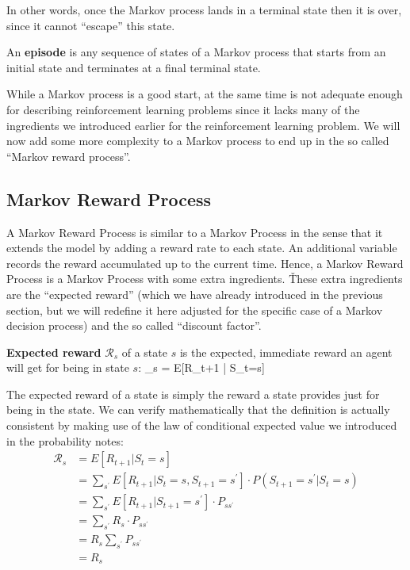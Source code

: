 In other words, once the Markov process lands in a terminal state then it is over, since it cannot ``escape'' this 
state.

\bd[Episode]
An \textbf{episode} is any sequence of states of a Markov process that starts from an initial state and terminates at
a final terminal state. 
\ed

While a Markov process is a good start, at the same time is not adequate enough for describing reinforcement 
learning problems since it lacks many of the ingredients we introduced earlier for the reinforcement learning problem. 
We will now add some more complexity to a Markov process to end up in the so called ``Markov reward process''.

\subsection{Markov Reward Process}

A Markov Reward Process is similar to a Markov Process in the sense that it extends the model by adding a reward rate
to each state. An additional variable records the reward accumulated up to the current time. Hence, a Markov Reward
Process is a Markov Process with some extra ingredients. \v

These extra ingredients are the ``expected reward'' (which we have already introduced in the previous section, but we
will redefine it here adjusted for the specific case of a Markov decision process) and the so called ``discount 
factor''.

\textbf{Expected reward} $\mathcal{R}_{s}$ of a state $s$ is the expected, immediate reward an agent will get for 
being in state $s$:
\bse
{}_{s} = E[R_{t+1} | S_t=s]
\ese
\ed

The expected reward of a state is simply the reward a state provides just for being in the state. We can verify 
mathematically that the definition is actually consistent by making use of the law of conditional expected value we 
introduced in the probability notes:
\begin{align*}
\mathcal{R}_{s} &= E[R_{t+1} | S_t=s] \\
&= \sum_{s^\prime} E[R_{t+1} | S_t=s, S_{t+1} = s^\prime] \cdot P(S_{t+1} = s^\prime | S_t = s) \\
&= \sum_{s^\prime} E[R_{t+1} | S_{t+1} = s^\prime] \cdot P_{s s^\prime} \\
&= \sum_{s^\prime} R_{s} \cdot P_{s s^\prime} \\
&= R_{s} \sum_{s^\prime} P_{s s^\prime} \\
&= R_{s}
\end{align*}

